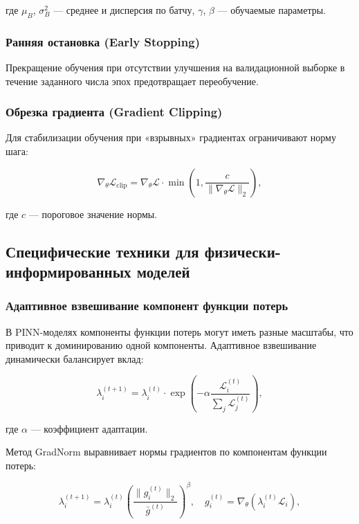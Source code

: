 где $\mu_B$, $\sigma_B^2$ — среднее и дисперсия по батчу, $\gamma$, $\beta$ — обучаемые параметры.

\subsubsection{Ранняя остановка (Early Stopping)}

Прекращение обучения при отсутствии улучшения на валидационной выборке в течение заданного числа эпох предотвращает переобучение.

\subsubsection{Обрезка градиента (Gradient Clipping)}

Для стабилизации обучения при «взрывных» градиентах ограничивают норму шага:

\begin{equation}
\nabla_{\theta} \mathcal{L}_{\text{clip}} = \nabla_{\theta} \mathcal{L} \cdot \min\left(1, \frac{c}{\|\nabla_{\theta} \mathcal{L}\|_2} \right),
\end{equation}

где $c$ — пороговое значение нормы.

\subsection{Специфические техники для физически-информированных моделей}

\subsubsection{Адаптивное взвешивание компонент функции потерь}

В PINN-моделях компоненты функции потерь могут иметь разные масштабы, что приводит к доминированию одной компоненты. Адаптивное взвешивание динамически балансирует вклад:

\begin{equation}
\lambda_i^{(t+1)} = \lambda_i^{(t)} \cdot \exp\left(-\alpha \frac{\mathcal{L}_i^{(t)}}{\sum_j \mathcal{L}_j^{(t)}}\right),
\end{equation}

где $\alpha$ — коэффициент адаптации.

Метод GradNorm выравнивает нормы градиентов по компонентам функции потерь:

\begin{equation}
\lambda_i^{(t+1)} = \lambda_i^{(t)} \left( \frac{\| g_i^{(t)} \|_2}{\bar{g}^{(t)}} \right)^{\beta}, \quad g_i^{(t)} = \nabla_{\theta} \left( \lambda_i^{(t)} \mathcal{L}_i \right),
\end{equation}

